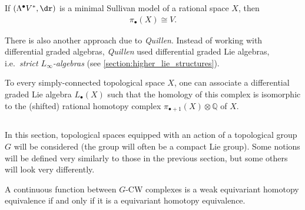     \begin{property}
        If $(\Lambda^\bullet V^*,\dr)$ is a minimal Sullivan model of a rational space $X$, then
        \begin{gather}
            \pi_\bullet(X)\cong V.
        \end{gather}
    \end{property}

    There is also another approach due to \textit{Quillen}. Instead of working with differential graded algebras, \textit{Quillen} used differential graded Lie algebras, i.e.~\textit{strict $L_\infty$-algebras} (see \cref{section:higher_lie_structures}).
    \begin{construct}
        To every simply-connected topological space $X$, one can associate a differential graded Lie algebra $L_\bullet(X)$ such that the homology of this complex is isomorphic to the (shifted) rational homotopy complex $\pi_{\bullet+1}(X)\otimes\mathbb{Q}$ of $X$.
    \end{construct}

\subsection{}

    In this section, topological spaces equipped with an action of a topological group $G$ will be considered (the group will often be a compact Lie group). Some notions will be defined very similarly to those in the previous section, but some others will look very differently.


    \begin{theorem}
        A continuous function between $G$-CW complexes is a weak equivariant homotopy equivalence if and only if it is a equivariant homotopy equivalence.
    \end{theorem}

